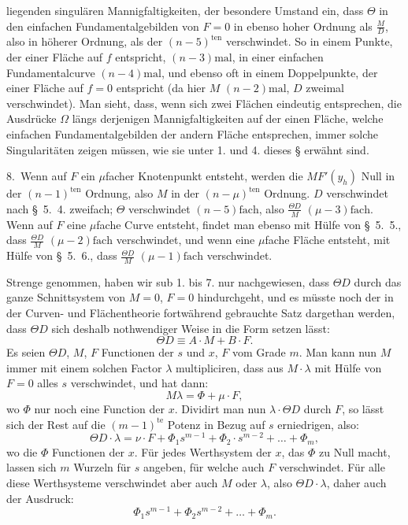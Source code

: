\documentclass{article}
\begin{document}
liegenden singulären Mannigfaltigkeiten, der besondere Umstand ein, dass $\Theta$ in den einfachen Fundamentalgebilden von $F = 0$ in ebenso hoher Ordnung als $\frac{M}{D}$, also in höherer Ordnung, als der $(n - 5)^{\text{ten}}$ verschwindet. So in einem Punkte, der einer Fläche auf $f$ entspricht, $(n - 3)\text{mal}$, in einer einfachen Fundamentalcurve $(n - 4)\text{mal}$, und ebenso oft in einem Doppelpunkte, der einer Fläche auf $f = 0$ entspricht (da hier $M$ $(n - 2)\text{mal}$, $D$ zweimal verschwindet). Man sieht, dass, wenn sich zwei Flächen eindeutig entsprechen, die Ausdrücke $\Omega$ längs derjenigen Mannigfaltigkeiten auf der einen Fläche, welche einfachen Fundamentalgebilden der andern Fläche entsprechen, immer solche Singularitäten zeigen müssen, wie sie unter 1. und 4. dieses § erwähnt sind.

8.~Wenn auf $F$ ein $\mu$facher Knotenpunkt entsteht, werden die $M F'(y_h)$ Null in der $(n - 1)^{\text{ten}}$ Ordnung, also $M$ in der $(n - \mu)^{\text{ten}}$ Ordnung. $D$ verschwindet nach §~5.~4. zweifach; $\Theta$ verschwindet $(n - 5)\text{fach}$, also $\frac{\Theta D}{M}$ $(\mu - 3)\text{fach}$. Wenn auf $F$ eine $\mu$fache Curve entsteht, findet man ebenso mit Hülfe von §~5.~5., dass $\frac{\Theta D}{M}$ $(\mu - 2)\text{fach}$ verschwindet, und wenn eine $\mu$fache Fläche entsteht, mit Hülfe von §~5.~6., dass $\frac{\Theta D}{M}$ $(\mu - 1)\text{fach}$ verschwindet.

Strenge genommen, haben wir sub 1. bis 7. nur nachgewiesen, dass $\Theta D$ durch das ganze Schnittsystem von $M = 0$, $F = 0$ hindurchgeht, und es müsste noch der in der Curven- und Flächentheorie fortwährend gebrauchte Satz dargethan werden, dass $\Theta D$ sich deshalb nothwendiger Weise in die Form setzen lässt:
\[
\Theta D \equiv A \cdot M + B \cdot F .
\]
Es seien $\Theta D$, $M$, $F$ Functionen der $s$ und $x$, $F$ vom Grade $m$. Man kann nun $M$ immer mit einem solchen Factor $\lambda$ multipliciren, dass aus $M \cdot \lambda$ mit Hülfe von $F = 0$ alles $s$ verschwindet, und hat dann:
\[
M \lambda = \Phi + \mu \cdot F ,
\]
wo $\Phi$ nur noch eine Function der $x$. Dividirt man nun $\lambda \cdot \Theta D$ durch $F$, so lässt sich der Rest auf die $(m - 1)^{\text{te}}$ Potenz in Bezug auf $s$ erniedrigen, also:
\[
\Theta D \cdot \lambda = \nu \cdot F + \Phi_1 s^{m-1} + \Phi_2 \cdot s^{m-2} + \dots + \Phi_m ,
\]
wo die $\Phi$ Functionen der $x$. Für jedes Werthsystem der $x$, das $\Phi$ zu Null macht, lassen sich $m$ Wurzeln für $s$ angeben, für welche auch $F$ verschwindet. Für alle diese Werthsysteme verschwindet aber auch $M$ oder $\lambda$, also $\Theta D \cdot \lambda$, daher auch der Ausdruck:
\[
\Phi_1 s^{m-1} + \Phi_2 s^{m-2} + \dots + \Phi_m .
\]
\end{document}
